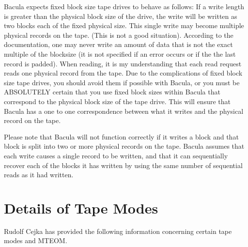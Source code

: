 Bacula expects fixed block size tape drives to behave as follows: If a write
length is greater than the physical block size of the drive, the write will be
written as two blocks each of the fixed physical size. This single write may
become multiple physical records on the tape. (This is not a good situation).
According to the documentation, one may never write an amount of data that is
not the exact multiple of the blocksize (it is not specified if an error
occurs or if the the last record is padded). When reading, it is my
understanding that each read request reads one physical record from the tape.
Due to the complications of fixed block size tape drives, you should avoid
them if possible with Bacula, or you must be ABSOLUTELY certain that you use
fixed block sizes within Bacula that correspond to the physical block size of
the tape drive. This will ensure that Bacula has a one to one correspondence
between what it writes and the physical record on the tape.

Please note that Bacula will not function correctly if it writes a block and
that block is split into two or more physical records on the tape. Bacula
assumes that each write causes a single record to be written, and that it can
sequentially recover each of the blocks it has written by using the same
number of sequential reads as it had written.

\section{Details of Tape Modes}
Rudolf Cejka has provided the following information concerning
certain tape modes and MTEOM.

